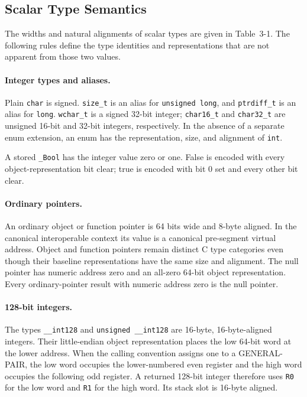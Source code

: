 \documentclass[10pt,twoside]{article}
\begin{document}
\subsection{Scalar Type Semantics}
The widths and natural alignments of scalar types are given in
Table~3-1. The following rules define the type identities and representations
that are not apparent from those two values.

\paragraph{Integer types and aliases.}
Plain \texttt{char} is signed. \texttt{size\_t} is an alias for
\texttt{unsigned long}, and \texttt{ptrdiff\_t} is an alias for
\texttt{long}. \texttt{wchar\_t} is a signed 32-bit integer;
\texttt{char16\_t} and \texttt{char32\_t} are unsigned 16-bit and 32-bit
integers, respectively. In the absence of a separate enum extension, an enum
has the representation, size, and alignment of \texttt{int}.

A stored \texttt{\_Bool} has the integer value zero or one. False is encoded
with every object-representation bit clear; true is encoded with bit 0 set and
every other bit clear.

\paragraph{Ordinary pointers.}
An ordinary object or function pointer is 64 bits wide and 8-byte aligned. In
the canonical interoperable context its value is a canonical pre-segment
virtual address. Object and function pointers remain distinct C type categories
even though their baseline representations have the same size and alignment.
The null pointer has numeric address zero and an all-zero
64-bit object representation. Every ordinary-pointer result with numeric
address zero is the null pointer.

\paragraph{128-bit integers.}
The types \texttt{\_\_int128} and \texttt{unsigned \_\_int128} are 16-byte,
16-byte-aligned integers. Their little-endian object representation places the
low 64-bit word at the lower address. When the calling convention assigns one
to a GENERAL-PAIR, the low word occupies the lower-numbered even register and
the high word occupies the following odd register. A returned 128-bit integer
therefore uses \texttt{R0} for the low word and \texttt{R1} for the high word.
Its stack slot is 16-byte aligned.
\end{document}
